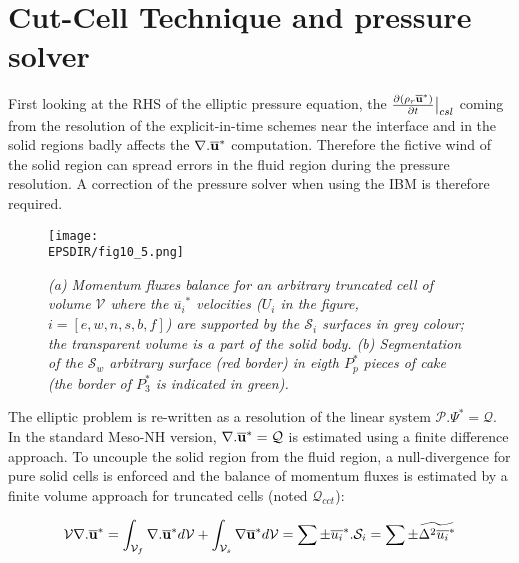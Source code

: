 \section{Cut-Cell Technique and pressure solver} 
\label{S_CCT}

First looking at the RHS of the elliptic pressure equation, the $\frac{\partial (\rho_{r}\overline{\bf{u}}^*)}{\partial t}\big|_{csl}$ coming from the resolution of the explicit-in-time schemes near the interface and in the solid regions badly affects the $\nabla .\overline{\bf{u}}^{*}$ computation. Therefore the fictive wind of the solid region can spread errors in the fluid region during the pressure resolution. A correction of the pressure solver when using the IBM is therefore required.

\begin{figure}[!ht]
\begin{center}
   \texttt{[image: \\EPSDIR/fig10\_5.png]} \\
	\vspace{-1mm} 
	\small \caption {{\it (a) Momentum fluxes balance for an arbitrary truncated cell of volume ${\mathcal V}$ where the $\overline{u_i}^*$ velocities ($U_i$ in the figure, $i=[e,w,n,s,b,f]$) are supported by the ${\mathcal S_i}$ surfaces in grey colour; the transparent volume is a part of the solid body. (b) Segmentation of the ${\mathcal S_w}$ arbitrary surface (red border) in eigth $P_p^*$ pieces of cake (the border of $P_3^*$ is indicated in green).}} 
\label{cheese0}
\end{center}
\end{figure}

The elliptic problem is re-written as a resolution of the linear system ${\mathcal P}.\Psi^{*}={\mathcal Q}$. In the standard Meso-NH version, $\nabla .\overline{\bf{u}}^{*}={\mathcal Q}$ is estimated using a finite difference approach. To uncouple the solid region from the fluid region, a null-divergence for pure solid cells is enforced and the balance of momentum fluxes is estimated by a finite volume approach for truncated cells (noted ${\mathcal Q}_{cct}$): 

\vspace{-0.25cm}
\begin{equation}
{\mathcal V} \nabla . \overline{\bf{u}}^{*} = \int_{\mathcal V_f} \nabla . \overline{\bf{u}}^{*} d{\mathcal V} + \int_{\mathcal V_s} \nabla \overline{\bf{u}}^{*} d{\mathcal V} = \sum \pm \overline{u_i}^{*}.{\mathcal S_i} = \sum \pm \widetilde{\Delta^2 \overline{u_i}^{*}}
\label{eqn_pres1}
\end{equation}
\vspace{-0.25cm}

